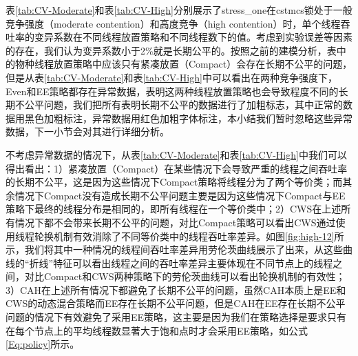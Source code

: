 表\ref{tab:CV-Moderate}和表\ref{tab:CV-High}分别展示了stress\_one在cstmcs锁处于一般竞争强度（moderate contention）和高度竞争（high contention）时，单个线程吞吐率的变异系数在不同线程放置策略和不同线程数下的值。考虑到实验误差等因素的存在，我们认为变异系数小于2\%就是长期公平的。按照之前的建模分析，表中的物种线程放置策略中应该只有紧凑放置（Compact）会存在长期不公平的问题，但是从表\ref{tab:CV-Moderate}和表\ref{tab:CV-High}中可以看出在两种竞争强度下，Even和EE策略都存在异常数据，表明这两种线程放置策略也会导致程度不同的长期不公平问题，我们把所有表明长期不公平的数据进行了加粗标志，其中正常的数据用黑色加粗标注，异常数据用红色加粗字体标注，本小结我们暂时忽略这些异常数据，下一小节会对其进行详细分析。

不考虑异常数据的情况下，从表\ref{tab:CV-Moderate}和表\ref{tab:CV-High}中我们可以得出看出：1）紧凑放置（Compact）在某些情况下会导致严重的线程之间吞吐率的长期不公平，这是因为这些情况下Compact策略将线程分为了两个等价类；而其余情况下Compact没有造成长期不公平问题主要是因为这些情况下Compact与EE策略下最终的线程分布是相同的，即所有线程在一个等价类中；2）CWS在上述所有情况下都不会带来长期不公平的问题，对比Compact策略可以看出CWS通过使用线程轮换机制有效消除了不同等价类中的线程吞吐率差异。如图\ref{fig:high-12}所示，我们将其中一种情况的线程间吞吐率差异用劳伦茨曲线展示了出来，从这些曲线的“折线”特征可以看出线程之间的吞吐率差异主要体现在不同节点上的线程之间，对比Compact和CWS两种策略下的劳伦茨曲线可以看出轮换机制的有效性；3）CAH在上述所有情况下都避免了长期不公平的问题，虽然CAH本质上是EE和CWS的动态混合策略而EE存在长期不公平问题，但是CAH在EE存在长期不公平问题的情况下有效避免了采用EE策略，这主要是因为我们在策略选择是要求只有在每个节点上的平均线程数显著大于饱和点时才会采用EE策略，如公式\ref{Eq:policy}所示。


